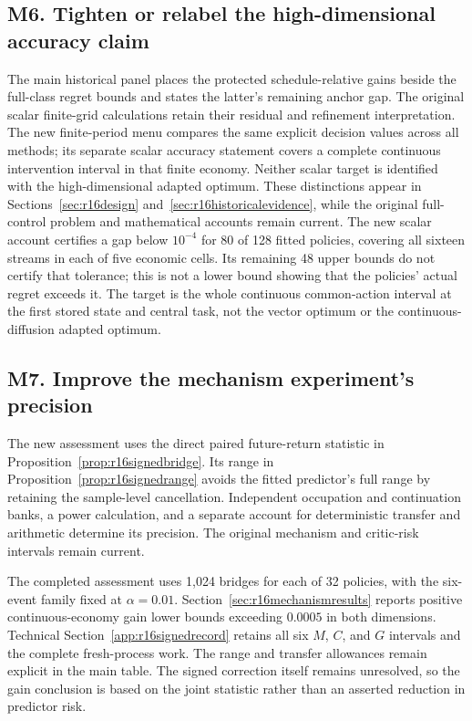 \subsection*{M6. Tighten or relabel the high-dimensional accuracy claim}\label{resp:M6}
The main historical panel places the protected schedule-relative gains beside the full-class regret bounds and states the latter's remaining anchor gap. The original scalar finite-grid calculations retain their residual and refinement interpretation. The new finite-period menu compares the same explicit decision values across all methods; its separate scalar accuracy statement covers a complete continuous intervention interval in that finite economy. Neither scalar target is identified with the high-dimensional adapted optimum. These distinctions appear in Sections~\ref{sec:r16design} and~\ref{sec:r16historicalevidence}, while the original full-control problem and mathematical accounts remain current. The new scalar account certifies a gap below $10^{-4}$ for 80 of 128 fitted policies, covering all sixteen streams in each of five economic cells. Its remaining 48 upper bounds do not certify that tolerance; this is not a lower bound showing that the policies' actual regret exceeds it. The target is the whole continuous common-action interval at the first stored state and central task, not the vector optimum or the continuous-diffusion adapted optimum.

\subsection*{M7. Improve the mechanism experiment's precision}\label{resp:M7}
The new assessment uses the direct paired future-return statistic in Proposition~\ref{prop:r16signedbridge}. Its range in Proposition~\ref{prop:r16signedrange} avoids the fitted predictor's full range by retaining the sample-level cancellation. Independent occupation and continuation banks, a power calculation, and a separate account for deterministic transfer and arithmetic determine its precision. The original mechanism and critic-risk intervals remain current.

The completed assessment uses 1,024 bridges for each of 32 policies, with the six-event family fixed at $\alpha=0.01$. Section~\ref{sec:r16mechanismresults} reports positive continuous-economy gain lower bounds exceeding $0.0005$ in both dimensions. Technical Section~\ref{app:r16signedrecord} retains all six $M$, $C$, and $G$ intervals and the complete fresh-process work. The range and transfer allowances remain explicit in the main table. The signed correction itself remains unresolved, so the gain conclusion is based on the joint statistic rather than an asserted reduction in predictor risk.

